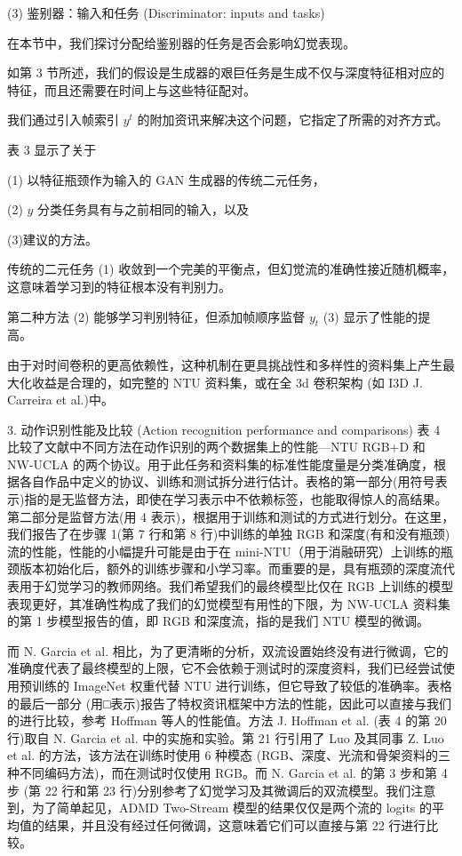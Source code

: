 (3) 鉴别器：输入和任务 (Discriminator: inputs and tasks)

在本节中，我们探讨分配给鉴别器的任务是否会影响幻觉表现。

如第 3 节所述，我们的假设是生成器的艰巨任务是生成不仅与深度特征相对应的特征，而且还需要在时间上与这些特征配对。

我们通过引入帧索引 $y^{t}$ 的附加资讯来解决这个问题，它指定了所需的对齐方式。

表 3 显示了关于

(1) 以特征瓶颈作为输入的 GAN 生成器的传统二元任务，

(2) $\hat{y}$ 分类任务具有与之前相同的输入，以及

(3)建议的方法。

传统的二元任务 (1) 收敛到一个完美的平衡点，但幻觉流的准确性接近随机概率，这意味着学习到的特征根本没有判别力。

第二种方法 (2) 能够学习判别特征，但添加帧顺序监督 $y_{t}$ (3) 显示了性能的提高。

由于对时间卷积的更高依赖性，这种机制在更具挑战性和多样性的资料集上产生最大化收益是合理的，如完整的 NTU 资料集，或在全 3d 卷积架构 (如 I3D  J. Carreira et al.)中。

3. 动作识别性能及比较 (Action recognition performance and comparisons) 
表 4 比较了文献中不同方法在动作识别的两个数据集上的性能—NTU RGB+D 和 NW-UCLA 的两个协议。用于此任务和资料集的标准性能度量是分类准确度，根据各自作品中定义的协议、训练和测试拆分进行估计。表格的第一部分(用符号表示)指的是无监督方法，即使在学习表示中不依赖标签，也能取得惊人的高结果。第二部分是监督方法(用 4 表示)，根据用于训练和测试的方式进行划分。在这里，我们报告了在步骤 1(第 7 行和第 8 行)中训练的单独 RGB 和深度(有和没有瓶颈)流的性能，性能的小幅提升可能是由于在 mini-NTU（用于消融研究）上训练的瓶颈版本初始化后，额外的训练步骤和小学习率。而重要的是，具有瓶颈的深度流代表用于幻觉学习的教师网络。我们希望我们的最终模型比仅在 RGB 上训练的模型表现更好，其准确性构成了我们的幻觉模型有用性的下限，为 NW-UCLA 资料集的第 1 步模型报告的值，即 RGB 和深度流，指的是我们 NTU 模型的微调。

而 N. Garcia et al. 相比，为了更清晰的分析，双流设置始终没有进行微调，它的准确度代表了最终模型的上限，它不会依赖于测试时的深度资料，我们已经尝试使用预训练的 ImageNet 权重代替 NTU 进行训练，但它导致了较低的准确率。表格的最后一部分 (用□表示)报告了特权资讯框架中方法的性能，因此可以直接与我们的进行比较，参考 Hoffman 等人的性能值。方法 J. Hoffman et al. (表 4 的第 20 行)取自  N. Garcia et al. 中的实施和实验。第 21 行引用了 Luo 及其同事 Z. Luo et al. 的方法，该方法在训练时使用 6 种模态 (RGB、深度、光流和骨架资料的三种不同编码方法)，而在测试时仅使用 RGB。而 N. Garcia et al. 的第 3 步和第 4 步 (第 22 行和第 23 行)分别参考了幻觉学习及其微调后的双流模型。我们注意到，为了简单起见，ADMD Two-Stream 模型的结果仅仅是两个流的 logits 的平均值的结果，并且没有经过任何微调，这意味着它们可以直接与第 22 行进行比较。

